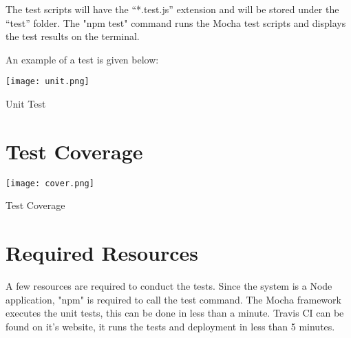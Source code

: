 \documentclass[10pt]{article}
\begin{document}
 
The test scripts will have the “*.test.js” extension and will be stored under the “test” folder. The "npm test" command runs the Mocha test scripts and displays the test results on the terminal.

\newpage
An example of a test is given below:

\hspace{5cm}

\texttt{[image: unit.png]}
\caption{Unit Test}
    

 \newpage


\section{Test Coverage}
\hspace{5cm}

\texttt{[image: cover.png]}
\caption{Test Coverage}

\newpage

\section{Required Resources}

\hspace{5cm}

A few resources are required to conduct the tests. Since the system is a Node application, "npm" is required to call the test command.
The Mocha framework executes the unit tests, this can be done in less than a minute.
Travis CI can be found on it's website, it runs the tests and deployment in less than 5 minutes.


 
\end{document}
